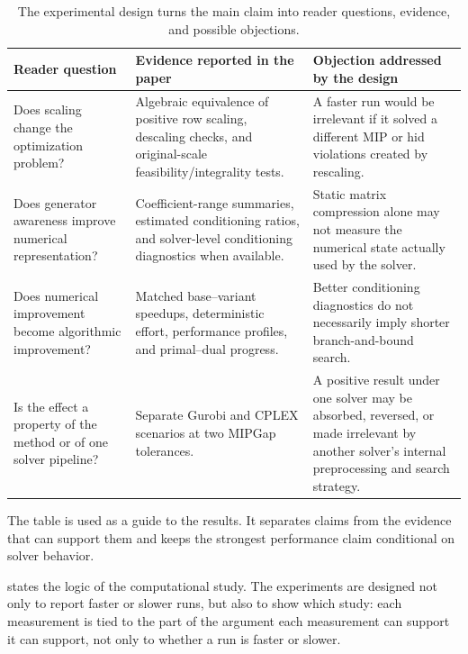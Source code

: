 \documentclass[AMA,Times1COL]{WileyNJDv5} %
\providecommand{\DIFadd}[1]{{\protect\color{blue} \sf #1}} %
\providecommand{\DIFdel}[1]{{\protect\color{red} \scriptsize #1}} %
\providecommand{\DIFaddbegin}{} %
\providecommand{\DIFaddend}{} %
\providecommand{\DIFdelbegin}{} %
\providecommand{\DIFdelend}{} %
\begin{document}
\begin{table}[t]
\centering
\caption{The experimental design turns the main claim into reader questions, evidence, and possible objections.}
\label{tab:argument-design}
\begin{threeparttable}
\small
\begin{tabular}{@{}p{}p{}p{}@{}}
\toprule
Reader question & Evidence reported in the paper & Objection addressed by the design \\
\midrule
Does scaling change the optimization problem? & Algebraic equivalence of positive row scaling, descaling checks, and original-scale feasibility/integrality tests. & A faster run would be irrelevant if it solved a different MIP or hid violations created by rescaling. \\
Does generator awareness improve numerical representation? & Coefficient-range summaries, estimated conditioning ratios, and solver-level conditioning diagnostics when available. & Static matrix compression alone may not measure the numerical state actually used by the solver. \\
Does numerical improvement become algorithmic improvement? & Matched base--variant speedups, deterministic effort, performance profiles, and primal--dual progress. & Better conditioning diagnostics do not necessarily imply shorter branch-and-bound search. \\
Is the effect a property of the method or of one solver pipeline? & Separate Gurobi and CPLEX scenarios at two MIPGap tolerances. & A positive result under one solver may be absorbed, reversed, or made irrelevant by another solver's internal preprocessing and search strategy. \\
\bottomrule
\end{tabular}
\begin{tablenotes}[flushleft]\footnotesize
\item The table is used as a guide to the results. It separates claims from the
evidence that can support them and keeps the strongest performance claim conditional on
solver behavior.
\end{tablenotes}
\end{threeparttable}
\end{table}

\noindent {} states the logic of the \DIFdelbegin \DIFdel{computational study. The
experiments are designed not only to report faster or slower runs, but also to
show which
}\DIFdelend \DIFaddbegin \DIFadd{study: each measurement is tied to
the }\DIFaddend part of the argument \DIFdelbegin \DIFdel{each measurement can support}\DIFdelend \DIFaddbegin \DIFadd{it can support, not only to whether a run is faster or slower}\DIFaddend .
\end{document}
